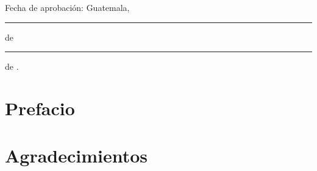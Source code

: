 \documentclass[11pt, letterpaper, twoside, openright]{report}
\newcommand{\defaultparformat}[1]{
	{\setlength{\parskip}{2ex}
     }
}
\begin{document}
	Fecha de aprobación: Guatemala, \rule[1pt]{0.5 in}{1pt} de \rule[1pt]{1 in}{1pt} de \anoaprobacion.
	\normalsize
\fi

\pagestyle{plain}
\ifdefined\CAPprefacio
	\newpage
	\cleardoublepage{}
    \chapter*{Prefacio}
    \ifdefined\parpordefecto
    	\defaultparformat{a-prefacio}
    \else
    	
    \fi
\fi

\ifdefined\CAPagradecimientos
	\newpage
	\cleardoublepage{}
    \chapter*{Agradecimientos}
    \ifdefined\parpordefecto
    	\defaultparformat{aa-agradecimientos}
    \else
    	
    \fi
\fi

\ifdefined\CAPindice
	\newpage
    \cleardoublepage{}
	\renewcommand{\contentsname}{Índice}
    \pdfbookmark{\contentsname}{toc}
	\tableofcontents
\fi

\ifdefined\CAPfiguras
	\newpage
    \cleardoublepage{}
	\renewcommand{\listfigurename}{Lista de figuras}
	\listoffigures
\fi

\ifdefined\CAPcuadros
	\newpage
    \cleardoublepage{}
	\renewcommand{\listtablename}{Lista de cuadros}
	\listoftables
\fi
\end{document}
